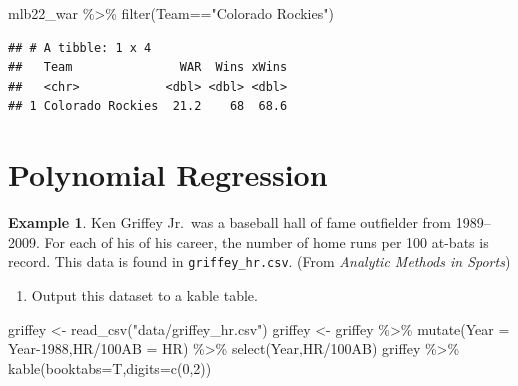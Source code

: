 \documentclass[
  11pt,
]{book}
\newenvironment{Shaded}{\begin{snugshade}}{\end{snugshade}}
\newcommand{\AttributeTok}[1]{\textcolor[rgb]{0.77,0.63,0.00}{#1}}
\newcommand{\DecValTok}[1]{\textcolor[rgb]{0.00,0.00,0.81}{#1}}
\newcommand{\FunctionTok}[1]{\textcolor[rgb]{0.00,0.00,0.00}{#1}}
\newcommand{\NormalTok}[1]{#1}
\newcommand{\OtherTok}[1]{\textcolor[rgb]{0.56,0.35,0.01}{#1}}
\newcommand{\SpecialCharTok}[1]{\textcolor[rgb]{0.00,0.00,0.00}{#1}}
\newcommand{\StringTok}[1]{\textcolor[rgb]{0.31,0.60,0.02}{#1}}
\providecommand{\tightlist}{%
  \setlength{\itemsep}{0pt}\setlength{\parskip}{0pt}}
\theoremstyle{definition}
\theoremstyle{definition}
\newtheorem{example}{Example}[chapter]
\theoremstyle{definition}
\theoremstyle{definition}
\theoremstyle{remark}
\begin{document}
\begin{Shaded}
\begin{Highlighting}[]
\NormalTok{mlb22\_war }\SpecialCharTok{\%\textgreater{}\%} \FunctionTok{filter}\NormalTok{(Team}\SpecialCharTok{==}\StringTok{"Colorado Rockies"}\NormalTok{)}
\end{Highlighting}
\end{Shaded}

\begin{verbatim}
## # A tibble: 1 x 4
##   Team               WAR  Wins xWins
##   <chr>            <dbl> <dbl> <dbl>
## 1 Colorado Rockies  21.2    68  68.6
\end{verbatim}

\newpage

\hypertarget{polynomial-regression}{%
\section{Polynomial Regression}\label{polynomial-regression}}

\begin{example}
Ken Griffey Jr.~was a baseball hall of fame outfielder from 1989--2009. For each of his of his career, the number of home runs per 100 at-bats is record. This data is found in \texttt{griffey\_hr.csv}. (From \textit{Analytic Methods in Sports})
\end{example}

\begin{enumerate}
\def\labelenumi{(\alph{enumi})}
\tightlist
\item
  Output this dataset to a kable table.
\end{enumerate}

\begin{Shaded}
\begin{Highlighting}[]
\NormalTok{griffey }\OtherTok{\textless{}{-}} \FunctionTok{read\_csv}\NormalTok{(}\StringTok{"data/griffey\_hr.csv"}\NormalTok{)}
\NormalTok{griffey }\OtherTok{\textless{}{-}}\NormalTok{ griffey }\SpecialCharTok{\%\textgreater{}\%} \FunctionTok{mutate}\NormalTok{(}\AttributeTok{Year =}\NormalTok{ Year}\DecValTok{{-}1988}\NormalTok{,}\StringTok{\textasciigrave{}}\AttributeTok{HR/100AB}\StringTok{\textasciigrave{}} \OtherTok{=}\NormalTok{ HR) }\SpecialCharTok{\%\textgreater{}\%} \FunctionTok{select}\NormalTok{(Year,}\StringTok{\textasciigrave{}}\AttributeTok{HR/100AB}\StringTok{\textasciigrave{}}\NormalTok{)}
\NormalTok{griffey }\SpecialCharTok{\%\textgreater{}\%} \FunctionTok{kable}\NormalTok{(}\AttributeTok{booktabs=}\NormalTok{T,}\AttributeTok{digits=}\FunctionTok{c}\NormalTok{(}\DecValTok{0}\NormalTok{,}\DecValTok{2}\NormalTok{))}
\end{Highlighting}
\end{Shaded}
\end{document}
